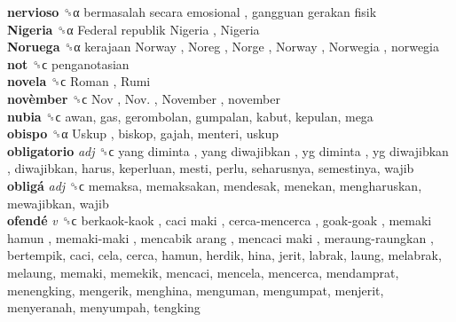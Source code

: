 \textbf{nervioso} ␝α   bermasalah secara emosional ,  gangguan gerakan fisik   \\
\textbf{Nigeria} ␝α   Federal republik Nigeria ,  Nigeria   \\
\textbf{Noruega} ␝α   kerajaan Norway ,  Noreg ,  Norge ,  Norway ,  Norwegia , norwegia  \\
\textbf{not} ␝ϲ  penganotasian  \\
\textbf{novela} ␝ϲ   Roman ,  Rumi   \\
\textbf{novèmber} ␝ϲ   Nov ,  Nov. ,  November , november  \\
\textbf{nubia} ␝ϲ  awan, gas, gerombolan, gumpalan, kabut, kepulan, mega  \\
\textbf{obispo} ␝α   Uskup , biskop, gajah, menteri, uskup  \\
\textbf{obligatorio} \emph{adj}  ␝ϲ   yang diminta ,  yang diwajibkan ,  yg diminta ,  yg diwajibkan , diwajibkan, harus, keperluan, mesti, perlu, seharusnya, semestinya, wajib  \\
\textbf{obligá} \emph{adj}  ␝ϲ  memaksa, memaksakan, mendesak, menekan, mengharuskan, mewajibkan, wajib  \\
\textbf{ofendé} \emph{v}  ␝ϲ   berkaok-kaok ,  caci maki ,  cerca-mencerca ,  goak-goak ,  memaki hamun ,  memaki-maki ,  mencabik arang ,  mencaci maki ,  meraung-raungkan , bertempik, caci, cela, cerca, hamun, herdik, hina, jerit, labrak, laung, melabrak, melaung, memaki, memekik, mencaci, mencela, mencerca, mendamprat, menengking, mengerik, menghina, menguman, mengumpat, menjerit, menyeranah, menyumpah, tengking  \\
